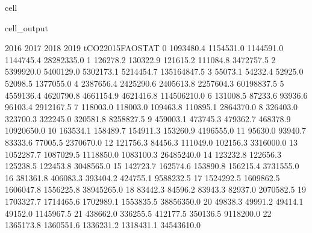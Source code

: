 \documentclass[letterpaper,10pt,english]{jupyterBook}
\begin{document}
\begin{sphinxuseclass}{cell}
\begin{sphinxVerbatimOutput}
\begin{sphinxuseclass}{cell_output}
\begin{sphinxVerbatim}[commandchars=\\\{\}]
         2016       2017       2018       2019  tCO2\PYGZus{}2015\PYGZus{}FAOSTAT  \PYGZbs{}
0   1093480.4  1154531.0  1144591.0  1144745.4         28282335.0   
1    126278.2   130322.9   121615.2   111084.8          3472757.5   
2   5399920.0  5400129.0  5302173.1  5214454.7        135164847.5   
3     55073.1    54232.4    52925.0    52098.5          1377055.0   
4   2387656.4  2425290.6  2405613.8  2257604.3         60198837.5   
5   4559136.4  4620790.8  4661154.9  4621416.8        114506210.0   
6    131008.5    87233.6    93936.6    96103.4          2912167.5   
7    118003.0   118003.0   109463.8   110895.1          2864370.0   
8    326403.0   323700.3   322245.0   320581.8          8258827.5   
9    459003.1   473745.3   479362.7   468378.9         10920650.0   
10   163534.1   158489.7   154911.3   153260.9          4196555.0   
11    95630.0    93940.7    83333.6    77005.5          2370670.0   
12   121756.3    84456.3   111049.0   102156.3          3316000.0   
13  1052287.7  1087029.5  1118850.0  1083100.3         26485240.0   
14   123232.8   122656.3   125238.5   122453.8          3048565.0   
15   142723.7   162574.6   153890.8   156215.4          3731555.0   
16   381361.8   406083.3   393404.2   424755.1          9588232.5   
17  1524292.5  1609862.5  1606047.8  1556225.8         38945265.0   
18    83442.3    84596.2    83943.3    82937.0          2070582.5   
19  1703327.7  1714465.6  1702989.1  1553835.5         38856350.0   
20    49838.3    49991.2    49414.1    49152.0          1145967.5   
21   438662.0   336255.5   412177.5   350136.5          9118200.0   
22  1365173.8  1360551.6  1336231.2  1318431.1         34543610.0   


\end{sphinxVerbatim}
\end{sphinxuseclass}
\end{sphinxVerbatimOutput}
\end{sphinxuseclass}
\end{document}
